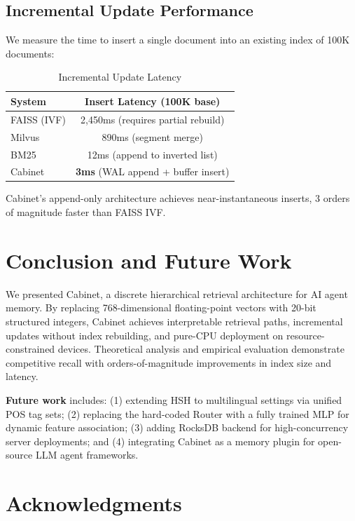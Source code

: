 \documentclass[11pt,a4paper]{article}
\theoremstyle{definition}
\begin{document}
\subsection{Incremental Update Performance}

We measure the time to insert a single document into an existing index of 100K documents:

\begin{table}[H]
\centering
\caption{Incremental Update Latency}
\label{tab:incremental}
\begin{tabular}{lc}
\toprule
\textbf{System} & \textbf{Insert Latency (100K base)} \\
\midrule
FAISS (IVF) & 2,450ms (requires partial rebuild) \\
Milvus & 890ms (segment merge) \\
BM25 & 12ms (append to inverted list) \\
\midrule
Cabinet & \textbf{3ms} (WAL append + buffer insert) \\
\bottomrule
\end{tabular}
\end{table}

Cabinet's append-only architecture achieves near-instantaneous inserts, 3 orders of magnitude faster than FAISS IVF.

\section{Conclusion and Future Work}
\label{sec:conclusion}

We presented Cabinet, a discrete hierarchical retrieval architecture for AI agent memory. By replacing 768-dimensional floating-point vectors with 20-bit structured integers, Cabinet achieves interpretable retrieval paths, incremental updates without index rebuilding, and pure-CPU deployment on resource-constrained devices. Theoretical analysis and empirical evaluation demonstrate competitive recall with orders-of-magnitude improvements in index size and latency.

\textbf{Future work} includes: (1) extending HSH to multilingual settings via unified POS tag sets; (2) replacing the hard-coded Router with a fully trained MLP for dynamic feature association; (3) adding RocksDB backend for high-concurrency server deployments; and (4) integrating Cabinet as a memory plugin for open-source LLM agent frameworks.

\section*{Acknowledgments}
\end{document}
